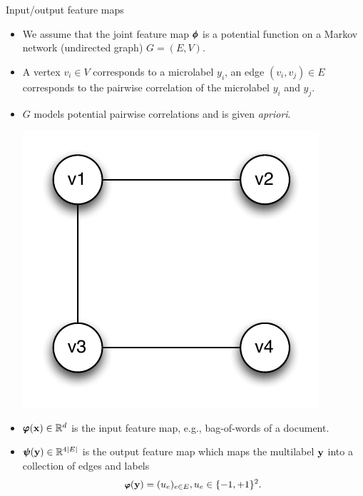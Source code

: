 \documentclass[first=dgreen,second=purple,logo=red]{aaltoslides}
\begin{document}
%
\begin{frame}{Input/output feature maps}
	\begin{itemize}\footnotesize
		\item We assume that the joint feature map $\pmb \phi$ is a potential function on a Markov network (undirected graph) $G=(E,V)$.
		\item A vertex $v_i\in V$ corresponds to a microlabel $y_i$, an edge $(v_i,v_j)\in E$ corresponds to the pairwise correlation of the microlabel $y_i$ and $y_j$.
		\item $G$ models potential pairwise correlations and is given {\em apriori}.
		\begin{center}
			\includegraphics[scale=0.3]{./figures/outputgraph.pdf}
		\end{center}
		\item $\pmb \varphi(\mathbf {x})\in\mathbb{R}^d$ is the input feature map, e.g., bag-of-words of a document.
		\item $\pmb \psi(\mathbf {y})\in\mathbb{R}^{4|E|}$ is the output feature map which maps the multilabel $\mathbf {y}$ into a collection of edges and labels
		\begin{align*}\footnotesize
			\pmb \varphi(\mathbf {y}) = (u_{e})_{e\in E},u_e\in\{-1,+1\}^2.
		\end{align*}
	\end{itemize}
\end{frame}
\end{document}
